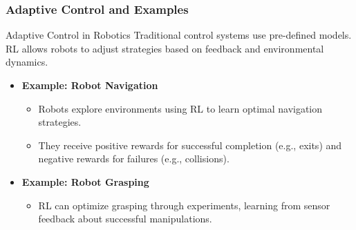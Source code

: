 \documentclass[aspectratio=169]{beamer}
\begin{document}
\begin{frame}[fragile]
    \frametitle{Adaptive Control and Examples}
    \begin{block}{Adaptive Control in Robotics}
        Traditional control systems use pre-defined models. RL allows robots to adjust strategies based on feedback and environmental dynamics.
    \end{block}

    \begin{itemize}
        \item \textbf{Example: Robot Navigation}
        \begin{itemize}
            \item Robots explore environments using RL to learn optimal navigation strategies.
            \item They receive positive rewards for successful completion (e.g., exits) and negative rewards for failures (e.g., collisions).
        \end{itemize}
        
        \item \textbf{Example: Robot Grasping}
        \begin{itemize}
            \item RL can optimize grasping through experiments, learning from sensor feedback about successful manipulations.
        \end{itemize}
    \end{itemize}
\end{frame}
\end{document}
